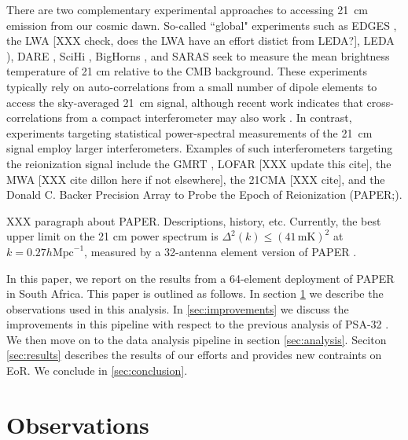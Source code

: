 \documentclass[twocolumn,numberedappendix]{emulateapj} \shorttitle{PSA64}
\begin{document}
There are two complementary experimental approaches to accessing 21~cm emission from
our cosmic dawn.  So-called ``global" experiments such as 
EDGES \citep{bowman_et_al2010}, 
the LWA \citep{ellingson_et_al2010} [XXX check, does the LWA have an effort distict from LEDA?], 
LEDA \citep{lincoln_bernardi_2012}), 
DARE \citep{burns_et_al2012}, 
SciHi \cite{tabitha_et_al2014}, 
BigHorns \citep{XXX},
and SARAS \citep{patra_et_al2015} 
seek to measure the
mean brightness temperature of 21 cm relative to the CMB background. These experiments
typically rely on auto-correlations from a small number of dipole elements to access
the sky-averaged 21~cm signal, although recent work indicates
that cross-correlations from a compact interferometer may also work \citep{presley_et_al2015}.
In contrast, experiments targeting statistical power-spectral measurements of the 21~cm
signal employ larger interferometers.  Examples of such interferometers targeting
the reionization signal include
the GMRT \citep{paciga_et_al2011},
LOFAR \citep{rottgering_et_al2006} [XXX update this cite], 
the MWA \citep{tingay_et_al2013} [XXX cite dillon here if not elsewhere],
the 21CMA [XXX cite],
and the Donald C. Backer Precision Array to Probe the Epoch of Reionization (PAPER;\citealt{parsons_et_al2010}). 

XXX paragraph about PAPER.  Descriptions, history, etc.
Currently, the best upper limit on the 21 cm power spectrum is $\Delta^2 (k) \leq (41\,\textrm{mK})^{2}$ at $k=0.27 h \text{Mpc}^{-1}$, measured by a 32-antenna element version of PAPER \citep{parsons_et_al2014}.


In this paper, we report on the results from a 64-element deployment of PAPER in South Africa.
 This paper is outlined as follows. In section
\ref{sec:observations} we describe the observations used in this analysis. In
\ref{sec:improvements} we discuss the improvements in this pipeline with respect
to the previous analysis of PSA-32 \cite{parsons_et_al2014}. We then move on to
the data analysis pipeline in section \ref{sec:analysis}. Seciton
\ref{sec:results} describes the results of our efforts and provides new
contraints on EoR. We conclude in \ref{sec:conclusion}.

\section{Observations}\label{sec:observations}
\end{document}
